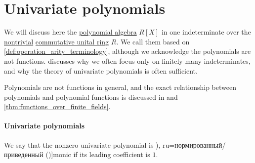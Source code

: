 \section{Univariate polynomials}\label{sec:univariate_polynomials}

We will discuss here the \hyperref[def:polynomial_algebra]{polynomial algebra} \( R[X] \) in one indeterminate over the \hyperref[def:ring/trivial]{nontrivial} \hyperref[def:ring/commutative]{commutative unital ring} \( R \). We call them  based on \cref{def:operation_arity_terminology}, although we acknowledge the polynomials are not functions.  discusses why we often focus only on finitely many indeterminates, and why the theory of univariate polynomials is often sufficient.

Polynomials are not functions in general, and the exact relationship between polynomials and polynomial functions is discussed in  and \cref{thm:functions_over_finite_fields}.

\paragraph{Univariate polynomials}

\begin{definition}\label{def:monic_polynomial}
  We say that the nonzero univariate polynomial is \term[bg=нормиран (\cite[409]{Обрешков1962ВисшаАлгебра}), ru=нормированный/приведенный (\cite[102]{Винберг2014КурсАлгебры})]{monic} if its leading coefficient is \( 1 \).
\end{definition}

